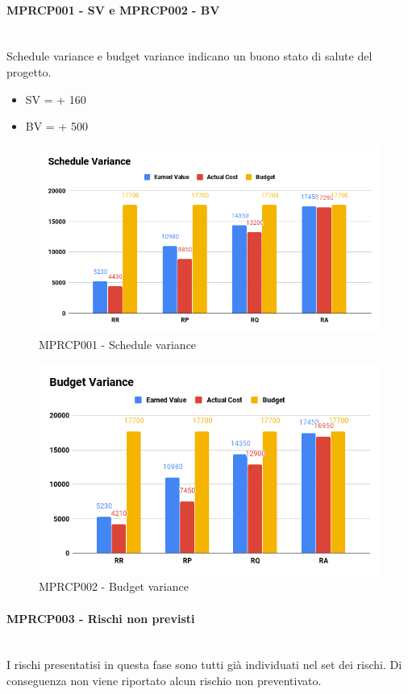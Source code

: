\paragraph{MPRCP001 - SV e MPRCP002 -  BV}\mbox{}\\[0.4cm]
Schedule variance e budget variance indicano un buono stato di salute del progetto.
\begin{itemize}
	\item SV = + 160
	\item BV = + 500
\end{itemize}
\begin{figure}[H]
	\centering
	\includegraphics[width=13cm,keepaspectratio]{../includes/pics/Schedule_VarianceRA.png}
	\caption{\label{fig:mission}MPRCP001 - Schedule variance}
\end{figure}
\begin{figure}[H]
	\centering
	\includegraphics[width=13cm,keepaspectratio]{../includes/pics/Budget_VarianceRA.png}
	\caption{\label{fig:mission}MPRCP002 - Budget variance}
\end{figure}
\paragraph{MPRCP003 - Rischi non previsti}\mbox{}\\[0.4cm]
I rischi presentatisi in questa fase sono tutti già individuati nel set dei rischi. Di conseguenza non viene riportato alcun rischio non preventivato.
